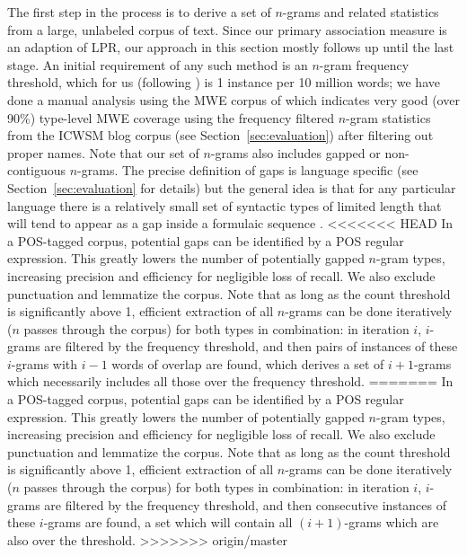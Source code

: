 \documentclass[11pt,letterpaper]{article}
\newcommand{\secref}[2][]{Section#1~\ref{#2}\xspace}
\begin{document}
The first step in the process is to derive a set of $n$-grams and related statistics from a large, unlabeled corpus of text. Since our primary association measure is an adaption of LPR, our approach in this section mostly follows  up until the last stage. An initial requirement of any such method is an $n$-gram frequency threshold, which for us (following ) is 1 instance per 10 million words; we have done a manual analysis using the MWE corpus of  which indicates very good (over 90\%) type-level MWE coverage using the frequency filtered $n$-gram statistics from the ICWSM blog corpus (see \secref{sec:evaluation}) after filtering out proper names. 
Note that our set of $n$-grams also includes gapped or non-contiguous $n$-grams. The precise definition of gaps is language specific (see \secref{sec:evaluation} for details) but the general idea is that for any particular language there is a relatively small set of syntactic types of limited length that will tend to appear as a gap inside a formulaic sequence \cite{Wasow:2002}.
<<<<<<< HEAD
 In a POS-tagged corpus, potential gaps can be identified by a POS regular expression. This greatly lowers the number of potentially gapped $n$-gram types, increasing precision and efficiency for negligible loss of recall. We also exclude punctuation and lemmatize the corpus.  Note that as long as the count threshold is significantly above 1, efficient extraction of all $n$-grams can be done iteratively ($n$ passes through the corpus) for both types in combination: in iteration $i$, $i$-grams are filtered by the frequency threshold, and then pairs of instances of these $i$-grams with $i-1$ words of overlap are found, which derives a set of $i+1$-grams which necessarily includes all those over the frequency threshold. 
=======
 In a POS-tagged corpus, potential gaps can be identified by a POS regular expression. This greatly lowers the number of potentially gapped $n$-gram types, increasing precision and efficiency for negligible loss of recall. We also exclude punctuation and lemmatize the corpus.  Note that as long as the count threshold is significantly above 1, efficient extraction of all $n$-grams can be done iteratively ($n$ passes through the corpus) for both types in combination: in iteration $i$, $i$-grams are filtered by the frequency threshold, and then consecutive instances of these $i$-grams are found, a set which will contain all $(i+1)$-grams which are also over the threshold. 
>>>>>>> origin/master
\end{document}
